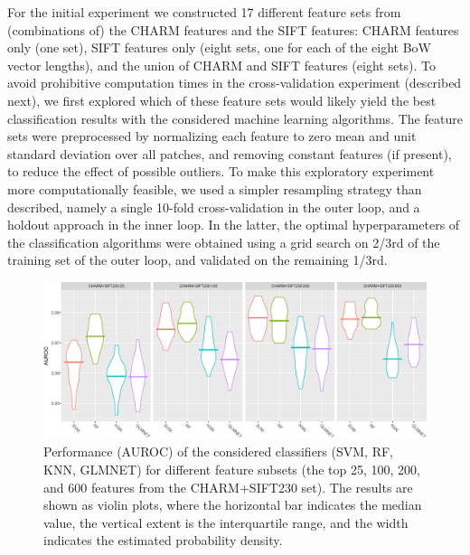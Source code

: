 For the initial experiment we constructed 17 different feature sets from (combinations of) the CHARM features and the SIFT features{\color{red}: CHARM features only (one set), SIFT features only (eight sets, one for each of the eight BoW vector lengths), and the union of CHARM and SIFT features (eight sets).} To avoid prohibitive computation times in the cross-validation experiment (described next), we first explored which of these feature sets would likely yield the best classification results with the considered machine learning algorithms. The feature sets were preprocessed by normalizing each feature to zero mean and unit standard deviation over all patches, and removing constant features (if present), to reduce the effect of possible outliers. To make this exploratory experiment more computationally feasible, we used a simpler resampling strategy than described, namely a single 10-fold cross-validation in the outer loop, and a holdout approach in the inner loop. In the latter, the optimal hyperparameters of the classification algorithms were obtained using a grid search on 2/3rd of the training set of the outer loop, and validated on the remaining 1/3rd.

\begin{figure}
	\centering
	\includegraphics[width=\textwidth]{fig06}
	\caption{\color{red}Performance (AUROC) of the considered classifiers (SVM, RF, KNN, GLMNET) for different feature subsets (the top 25, 100, 200, and 600 features from the CHARM+SIFT230 set). The results are shown as violin plots, where the horizontal bar indicates the median value, the vertical extent is the interquartile range, and the width indicates the estimated probability density.}
	\label{fig:subsetResults}
\end{figure}

